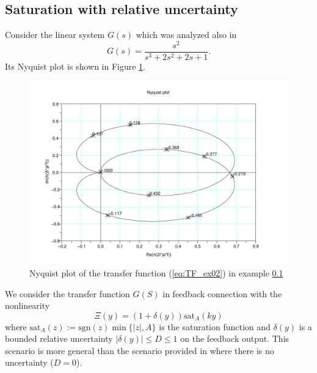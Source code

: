 \documentclass[letterpaper,10pt,conference,twocolumn]{IEEEtran}
\newcommand{\sat}{\mathrm{sat}}
\newcommand{\sgn}{\mathrm{sgn}}
\begin{document}
\subsection{Saturation with relative uncertainty}\label{subsec:ex02}
Consider the linear system $G(s)$ which was analyzed also in \cite{MegRan97}
\begin{equation}\label{eq:TF_ex02}
	G(s)=\frac{s^2}
		{s^3+2s^2+2s+1}.
\end{equation}
Its Nyquist plot is shown in Figure \ref{fig:nyquist Megretski example}.
\begin{figure}
	\centering
	\includegraphics[width=1\columnwidth]{nyquist_MegreskiExample}
	\caption{Nyquist plot of the transfer function (\ref{eq:TF_ex02}) in example
	\ref{subsec:ex02} \label{fig:nyquist Megretski example}}
\end{figure}
We consider the transfer function $G(S)$ in feedback connection with the nonlinearity \begin{equation*}
	\Xi(y)=(1+\delta(y))\sat_A(ky)
\end{equation*}
where $\sat_A(z):=\sgn(z)\min\{|z|,A \}$ is the saturation function
and $\delta(y)$ is a bounded relative uncertainty $|\delta(y)|\leq D\leq 1$ on the feedback output.
This scenario is more general than the scenario provided in \cite{MegRan97} where there is no uncertainty ($D=0$).
\end{document}
